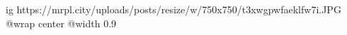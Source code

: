  
 
 
 
 

\ifcmt
  ig https://mrpl.city/uploads/posts/resize/w/750x750/t3xwgpwfaeklfw7i.JPG
  @wrap center
  @width 0.9
\fi
